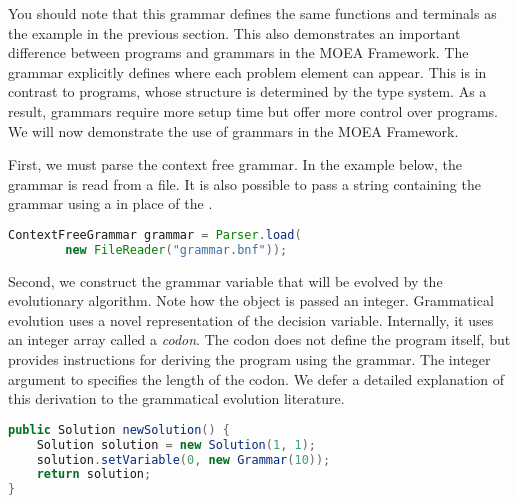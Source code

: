 You should note that this grammar defines the same functions and terminals as the example in the previous section.  This also demonstrates an important difference between programs and grammars in the MOEA Framework.  The grammar explicitly defines where each problem element can appear.  This is in contrast to programs, whose structure is determined by the type system.  As a result, grammars require more setup time but offer more control over programs.  We will now demonstrate the use of grammars in the MOEA Framework.

First, we must parse the context free grammar.  In the example below, the grammar is read from a file.  It is also possible to pass a string containing the grammar using a  in place of the .
\begin{lstlisting}[language=Java]
    ContextFreeGrammar grammar = Parser.load(
        new FileReader("grammar.bnf"));
\end{lstlisting}

Second, we construct the grammar variable that will be evolved by the evolutionary algorithm.  Note how the  object is passed an integer.  Grammatical evolution uses a novel representation of the decision variable.  Internally, it uses an integer array called a \emph{codon}.  The codon does not define the program itself, but provides instructions for deriving the program using the grammar.  The integer argument to  specifies the length of the codon.  We defer a detailed explanation of this derivation to the grammatical evolution literature.
\begin{lstlisting}[language=Java]
public Solution newSolution() {
    Solution solution = new Solution(1, 1);
    solution.setVariable(0, new Grammar(10));
    return solution;
}
\end{lstlisting}

